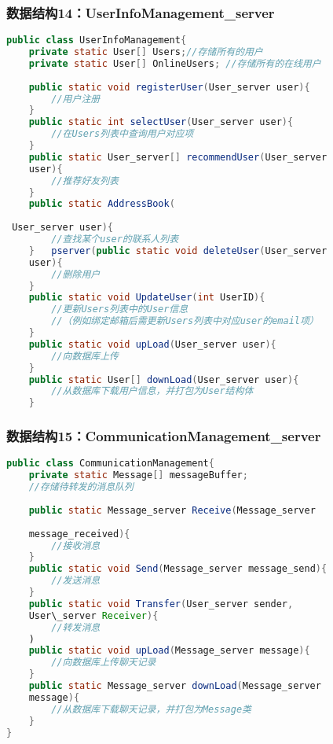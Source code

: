 \subsubsection{数据结构14：UserInfoManagement\_server}

\begin{lstlisting}[language=Java, caption=用户信息管理类]
public class UserInfoManagement{
    private static User[] Users;//存储所有的用户
    private static User[] OnlineUsers; //存储所有的在线用户
    
    public static void registerUser(User_server user){
        //用户注册
    }
    public static int selectUser(User_server user){
        //在Users列表中查询用户对应项
    }
    public static User_server[] recommendUser(User_server
    user){
        //推荐好友列表
    }
    public static AddressBook(
    
 User_server user){
        //查找某个user的联系人列表
    }   pserver(public static void deleteUser(User_server 
    user){
        //删除用户
    }
    public static void UpdateUser(int UserID){
        //更新Users列表中的User信息
        //（例如绑定邮箱后需更新Users列表中对应user的email项）
    }
    public static void upLoad(User_server user){
        //向数据库上传
    }
    public static User[] downLoad(User_server user){
        //从数据库下载用户信息，并打包为User结构体
    }
\end{lstlisting}

\subsubsection{数据结构15：CommunicationManagement\_server}
\begin{lstlisting}[language=Java, caption=通讯管理类]
public class CommunicationManagement{
    private static Message[] messageBuffer; 
    //存储待转发的消息队列
    
    public static Message_server Receive(Message_server
    
    message_received){
        //接收消息
    }
    public static void Send(Message_server message_send){
        //发送消息
    }
    public static void Transfer(User_server sender, 
    User\_server Receiver){
        //转发消息
    )
    public static void upLoad(Message_server message){
        //向数据库上传聊天记录
    }
    public static Message_server downLoad(Message_server 
    message){
        //从数据库下载聊天记录，并打包为Message类
    }
}
\end{lstlisting}
